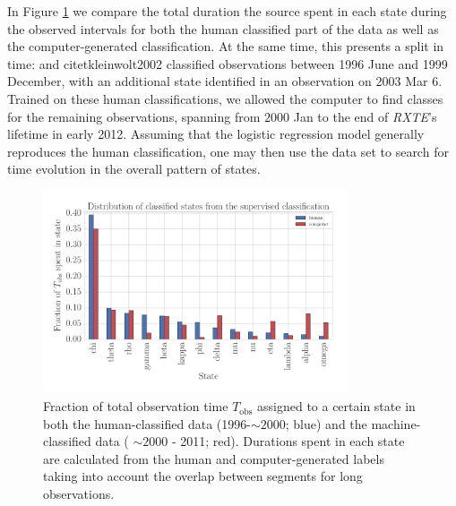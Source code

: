 \documentclass[12pt]{emulateapj}
\newcommand{\project}[1]{\textsl{#1}}
\newcommand{\rxte}{\project{RXTE}}
\begin{document}
In Figure \ref{fig:state_durations} we compare the total duration the source spent in each state during the observed intervals for both the human classified part of the data as well as the computer-generated classification. At the same time, this presents a split in time: \citet{belloni2000} and citet{kleinwolt2002} classified observations between 1996 June and 1999 December, with an additional state identified in an observation on 2003 Mar 6. Trained on these human classifications,
we allowed the computer to find classes for the remaining observations, spanning from $2000$ Jan to the end of \rxte's lifetime in early 2012. 
Assuming that the logistic regression model generally reproduces the human classification, one may then use the data set to search for time evolution in the overall pattern of states. 

\begin{figure}[htbp]
\begin{center}
\includegraphics[width=9cm]{grs1915_supervised_states_histogram.pdf}
\caption{Fraction of total observation time $T_\mathrm{obs}$ assigned to a certain state in both the human-classified data (1996-$\sim\!\! 2000$; blue) and the machine-classified data ( $\sim\!\! 2000$ - 2011; red). Durations spent in each state are calculated from the human and computer-generated labels taking into 
account the overlap between segments for long observations.} 
\label{fig:state_durations}
\end{center}
\end{figure}
\end{document}

